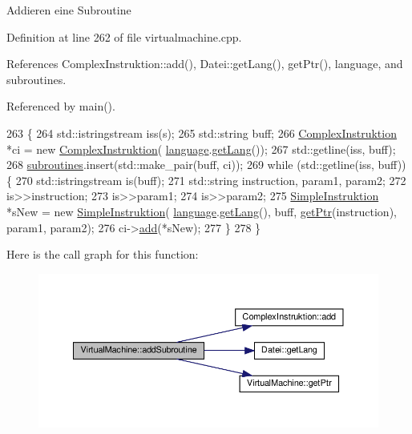 Addieren eine Subroutine 

Definition at line 262 of file virtualmachine.\+cpp.



References Complex\+Instruktion\+::add(), Datei\+::get\+Lang(), get\+Ptr(), language, and subroutines.



Referenced by main().


\begin{DoxyCode}
263 \{
264     std::istringstream iss(s);
265     std::string buff;
266     \mbox{\hyperlink{class_complex_instruktion}{ComplexInstruktion}} *ci = \textcolor{keyword}{new} \mbox{\hyperlink{class_complex_instruktion}{ComplexInstruktion}}(
      \mbox{\hyperlink{class_virtual_machine_af4dd2663e7f1ea25ba6c88da94e6ef01}{language}}.\mbox{\hyperlink{class_datei_aeeaf8e269f4d2b53e209ad905b5b75c5}{getLang}}());
267     std::getline(iss, buff);
268     \mbox{\hyperlink{class_virtual_machine_a91f5b9cfc45eaea5ce95b659705b2803}{subroutines}}.insert(std::make\_pair(buff, ci));
269     \textcolor{keywordflow}{while} (std::getline(iss, buff)) \{
270         std::istringstream is(buff);
271         std::string instruction, param1, param2;
272         is>>instruction;
273         is>>param1;
274         is>>param2;
275         \mbox{\hyperlink{class_simple_instruktion}{SimpleInstruktion}} *sNew = \textcolor{keyword}{new} \mbox{\hyperlink{class_simple_instruktion}{SimpleInstruktion}}(
      \mbox{\hyperlink{class_virtual_machine_af4dd2663e7f1ea25ba6c88da94e6ef01}{language}}.\mbox{\hyperlink{class_datei_aeeaf8e269f4d2b53e209ad905b5b75c5}{getLang}}(), buff, \mbox{\hyperlink{class_virtual_machine_a7029636f9766e0394a8b9d60264a3565}{getPtr}}(instruction), param1, param2);
276         ci->\mbox{\hyperlink{class_complex_instruktion_ae92fcdd92e0328d4eed826dea81b8c9c}{add}}(*sNew);
277     \}
278 \}
\end{DoxyCode}
Here is the call graph for this function\+:
\nopagebreak
\begin{figure}[H]
\begin{center}
\leavevmode
\includegraphics[width=350pt]{class_virtual_machine_a52907412b34a0b747bfaa26c48253aa9_cgraph}
\end{center}
\end{figure}
